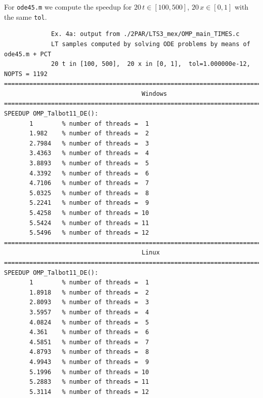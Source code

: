 \documentclass[a4paper,10pt]{report}%
\begin{document}
\newpage
\noindent For {\tt ode45.m} we compute the speedup for $20\,t\in[100,500]$, $20\,x\in[0,1]$ with the same {\tt tol}.
\begin{lstlisting}
             Ex. 4a: output from ./2PAR/LTS3_mex/OMP_main_TIMES.c
             LT samples computed by solving ODE problems by means of ode45.m + PCT
             20 t in [100, 500],  20 x in [0, 1],  tol=1.000000e-12,   NOPTS = 1192
====================================================================================
                                      Windows
====================================================================================
SPEEDUP OMP_Talbot11_DE():
       1        % number of threads =  1
       1.982    % number of threads =  2
       2.7984   % number of threads =  3
       3.4363   % number of threads =  4
       3.8893   % number of threads =  5
       4.3392   % number of threads =  6
       4.7106   % number of threads =  7
       5.0325   % number of threads =  8
       5.2241   % number of threads =  9
       5.4258   % number of threads = 10
       5.5424   % number of threads = 11
       5.5496   % number of threads = 12
====================================================================================
                                      Linux
====================================================================================
SPEEDUP OMP_Talbot11_DE():
       1        % number of threads =  1
       1.8918   % number of threads =  2
       2.8093   % number of threads =  3
       3.5957   % number of threads =  4
       4.0824   % number of threads =  5
       4.361    % number of threads =  6
       4.5851   % number of threads =  7
       4.8793   % number of threads =  8
       4.9943   % number of threads =  9
       5.1996   % number of threads = 10
       5.2883   % number of threads = 11
       5.3114   % number of threads = 12


\end{lstlisting}
\end{document}
